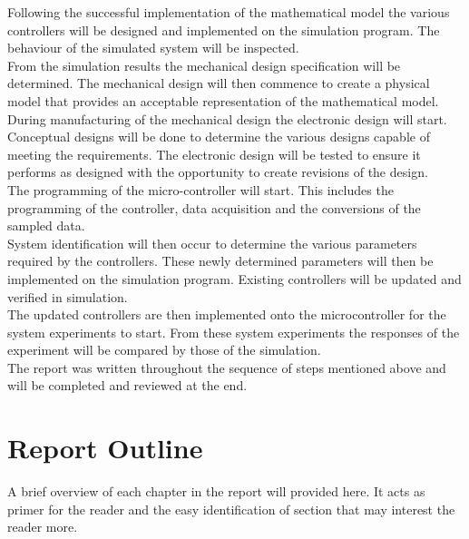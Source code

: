 Following the successful implementation of the mathematical model the various controllers will be designed and implemented on the simulation program. The behaviour of the simulated system will be inspected.\\

From the simulation results the mechanical design specification will be determined. The mechanical design will then commence to create a physical model that provides an acceptable representation of the mathematical model.\\

During manufacturing of the mechanical design the electronic design will start. Conceptual designs will be done to determine the various designs capable of meeting the requirements. The electronic design will be tested to ensure it performs as designed with the opportunity to create revisions of the design.\\

The programming of the micro-controller will start. This includes the programming of the controller, data acquisition and the conversions of the sampled data.\\

System identification will then occur to determine the various parameters required by the controllers. These newly determined parameters will then be implemented on the simulation program. Existing controllers will be updated and verified in simulation.\\

The updated controllers are then implemented onto the microcontroller for the system experiments to start. From these system experiments the responses of the experiment will be compared by those of the simulation.\\

The report was written throughout the sequence of steps mentioned above and will be completed and reviewed at the end.


\section{Report Outline}

A brief overview of each chapter in the report will provided here. It acts as primer for the reader and the easy identification of section that may interest the reader more.\\

